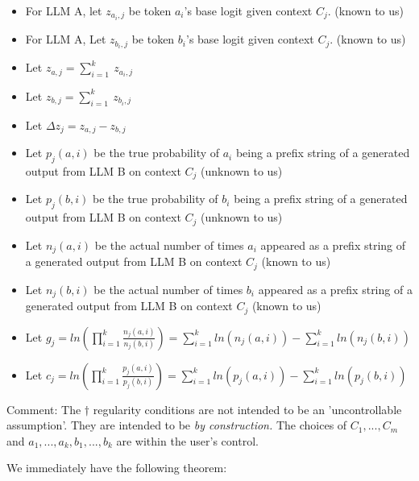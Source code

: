 \documentclass{article}
\begin{document}
\begin{itemize}
\item For LLM A, let $\displaystyle z_{a_{i} ,j}$ be token $\displaystyle a_{i}$'s base logit given context $\displaystyle C_{j}$. (known to us)
\item For LLM A, Let $\displaystyle z_{b_{i} ,j}$ be token $\displaystyle b_{i}$'s base logit given context $\displaystyle C_{j}$. (known to us)
\item Let $\displaystyle z_{a,j} =\sum _{i=1}^{k} \ z_{a_{i} ,j}$
\item Let $\displaystyle z_{b,j} =\sum _{i=1}^{k} \ z_{b_{i} ,j}$
\item Let $\displaystyle \Delta z_{j} =z_{a,j} -z_{b,j}$
\item Let $\displaystyle p_{j}( a,i)$ be the true probability of $\displaystyle a_{i}$ being a prefix string of a generated output from LLM B on context $\displaystyle C_{j}$ (unknown to us)
\item Let $\displaystyle p_{j}( b,i)$ be the true probability of $\displaystyle b_{i}$ being a prefix string of a generated output from LLM B on context $\displaystyle C_{j}$ (unknown to us)
\item Let $\displaystyle n_{j}( a,i)$ be the actual number of times $\displaystyle a_{i}$ appeared as a prefix string of a generated output from LLM B on context $\displaystyle C_{j}$ (known to us)
\item Let $\displaystyle n_{j}( b,i)$ be the actual number of times $\displaystyle b_{i}$ appeared as a prefix string of a generated output from LLM B on context $\displaystyle C_{j}$ (known to us)
\item Let $\displaystyle g_{j} =ln\left(\prod _{i=1}^{k}\frac{n_{j}( a,i)}{n_{j}( b,i)}\right) =\sum _{i=1}^{k} ln( n_{j}( a,i)) -\sum _{i=1}^{k} ln( n_{j}( b,i))$
\item Let $\displaystyle c_{j} =ln\left(\prod _{i=1}^{k}\frac{p_{j}( a,i)}{p_{j}( b,i)}\right) =\sum _{i=1}^{k} ln( p_{j}( a,i)) -\sum _{i=1}^{k} ln( p_{j}( b,i))$
\end{itemize}



Comment: The $\displaystyle \dagger $ regularity conditions are not intended to be an 'uncontrollable assumption'. They are intended to be \textit{by construction.} The choices of $\displaystyle C_{1} ,...,C_{m}$ and $\displaystyle a_{1} ,...,a_{k} ,b_{1} ,...,b_{k}$ are within the user's control.



We immediately have the following theorem:
\end{document}
